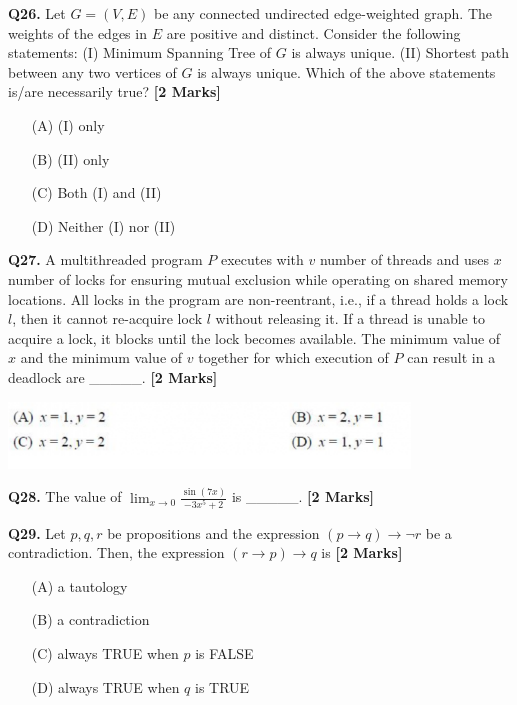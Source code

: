 \documentclass[11pt]{article}
\newcommand{\questionb}[2]{
    \noindent\textbf{Q#2.} #1 \hfill \textbf{[2 Marks]}
}
\begin{document}
\questionb{Let \( G = (V, E) \) be any connected undirected edge-weighted graph. The weights of the edges in \( E \) are positive and distinct.  
Consider the following statements:  
(I) Minimum Spanning Tree of \( G \) is always unique.  
(II) Shortest path between any two vertices of \( G \) is always unique.  
Which of the above statements is/are necessarily true?}{26}
\begin{enumerate}
    \item[(A)] (I) only  
    \item[(B)] (II) only  
    \item[(C)] Both (I) and (II)  
    \item[(D)] Neither (I) nor (II)  
\end{enumerate}
\vspace{0.5cm}

\questionb{A multithreaded program \( P \) executes with \( v \) number of threads and uses \( x \) number of locks for ensuring mutual exclusion while operating on shared memory locations.  
All locks in the program are non-reentrant, i.e., if a thread holds a lock \( l \), then it cannot re-acquire lock \( l \) without releasing it.  
If a thread is unable to acquire a lock, it blocks until the lock becomes available.  
The minimum value of \( x \) and the minimum value of \( v \) together for which execution of \( P \) can result in a deadlock are \_\_\_\_\_.}{27}
\begin{center}
\includegraphics[width=0.8\textwidth]{figures/27.png}
\end{center}
\vspace{0.5cm}

\questionb{The value of \( \lim_{x \to 0} \frac{\sin(7x)}{-3x^5 + 2} \) is \_\_\_\_\_.}{28}
\vspace{0.5cm}

\questionb{Let \( p, q, r \) be propositions and the expression \( (p \rightarrow q) \rightarrow \neg r \) be a contradiction.  
Then, the expression \( (r \rightarrow p) \rightarrow q \) is}{29}
\begin{enumerate}
    \item[(A)] a tautology  
    \item[(B)] a contradiction  
    \item[(C)] always TRUE when \( p \) is FALSE  
    \item[(D)] always TRUE when \( q \) is TRUE  
\end{enumerate}
\vspace{0.5cm}
\end{document}
